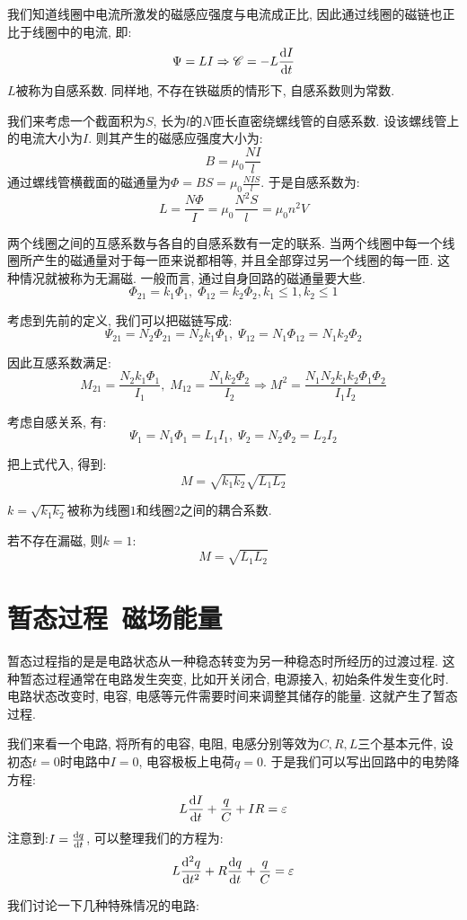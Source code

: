 我们知道线圈中电流所激发的磁感应强度与电流成正比, 因此通过线圈的磁链也正比于线圈中的电流, 即:
\[
\Psi = LI \Rightarrow \mathscr C = -L\frac{\mathop{}\!\mathrm{d} I}{\mathop{}\!\mathrm{d} t}
\]
$L$被称为自感系数. 同样地, 不存在铁磁质的情形下, 自感系数则为常数.

我们来考虑一个截面积为$S$, 长为$l$的$N$匝长直密绕螺线管的自感系数. 设该螺线管上的电流大小为$I$. 则其产生的磁感应强度大小为:
\[
B = \mu_0\frac{NI}{l}
\]
通过螺线管横截面的磁通量为$\Phi= BS=\mu_0\frac{NIS}{l}$. 于是自感系数为:
\[
L =\frac{N\Phi}{I}=\mu_0\frac{N^2S}{l} = \mu_0 n^2 V
\]

两个线圈之间的互感系数与各自的自感系数有一定的联系. 当两个线圈中每一个线圈所产生的磁通量对于每一匝来说都相等, 并且全部穿过另一个线圈的每一匝. 这种情况就被称为无漏磁. 一般而言, 通过自身回路的磁通量要大些.
\[
\Phi_{21} = k_1 \Phi_1, \;\Phi_{12} = k_2 \Phi_2, k_1\le 1, k_2\le 1
\]

考虑到先前的定义, 我们可以把磁链写成:
\[
\Psi_{21} = N_2 \Phi_{21} = N_2 k_1 \Phi_1,\; \Psi_{12} = N_1 \Phi_{12} = N_1 k_2 \Phi_2
\]

因此互感系数满足:
\[
M_{21}=\frac{N_2k_1\Phi_1}{I_1},\;M_{12}=\frac{N_1k_2\Phi_2}{I_2}\Rightarrow M^2 =\frac{N_1N_2k_1k_2\Phi_1\Phi_2}{I_1I_2}
\]

考虑自感关系, 有:
\[
\Psi_1 = N_1 \Phi_1 = L_1 I_1,\;\Psi_2 = N_2 \Phi_2 = L_2 I_2
\]

把上式代入, 得到:
\[
M = \sqrt{k_1k_2}\sqrt{L_1L_2}
\]

$k=\sqrt{k_1k_2}$被称为线圈$1$和线圈$2$之间的耦合系数.

若不存在漏磁, 则$k=1$:
\[
M=\sqrt{L_1L_2}
\]

\section{\texorpdfstring{暂态过程\, 磁场能量}{暂态过程 磁场能量}}
暂态过程指的是是电路状态从一种稳态转变为另一种稳态时所经历的过渡过程. 这种暂态过程通常在电路发生突变, 比如开关闭合, 电源接入, 初始条件发生变化时. 电路状态改变时, 电容, 电感等元件需要时间来调整其储存的能量. 这就产生了暂态过程.

我们来看一个电路, 将所有的电容, 电阻, 电感分别等效为$C,R,L$三个基本元件, 设初态$t=0$时电路中$I=0$, 电容极板上电荷$q=0$. 于是我们可以写出回路中的电势降方程:
\[
L\frac{\mathop{}\!\mathrm{d} I}{\mathop{}\!\mathrm{d} t}+\frac{q}{C}+IR = \varepsilon
\]
注意到:$I=\frac{\mathop{}\!\mathrm{d} q}{\mathop{}\!\mathrm{d} t}$, 可以整理我们的方程为:
\[
L\frac{\mathop{}\!\mathrm{d}^2 q}{\mathop{}\!\mathrm{d} t^2}+R\frac{\mathop{}\!\mathrm{d} q}{\mathop{}\!\mathrm{d} t}+\frac{q}{C}=\varepsilon
\]

我们讨论一下几种特殊情况的电路:

